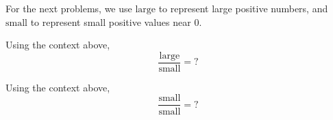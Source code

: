 \documentclass{ximera}
\begin{document}
For the next problems, we use $\text{large}$ to represent large positive numbers, and $\text{small}$ to represent
small positive values near $0$.

\begin{problem}
  Using the context above, 
  \[
  \frac{\text{large}}{\text{small}} = ?
  \]
  \begin{multipleChoice}
  \end{multipleChoice}
\end{problem}

\begin{problem}
  Using the context above, 
  \[
  \frac{\text{small}}{\text{small}} = ?
  \]
  \begin{multipleChoice}
  \end{multipleChoice}
\end{problem}


\end{document}
